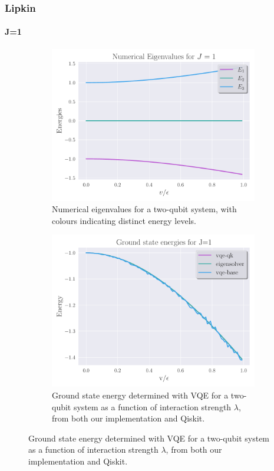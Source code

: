 \documentclass{beamer}
\begin{document}
\begin{frame}[t]
	\frametitle{Lipkin}
	\framesubtitle{J=1}
	\begin{figure}[ht]
		\centering
		\begin{subfigure}[b]{0.45\textwidth}
		\begin{center}
			\includegraphics[width=\textwidth]{../src/plots/eigs-lipkin-2.pdf}
		\end{center}
		\caption{Numerical eigenvalues for a two-qubit system, with colours indicating distinct energy levels.}
		\label{fig:eig-lipkin-2}
		\end{subfigure}
		\hfill
		\begin{subfigure}[b]{0.45\textwidth}
		\begin{center}
			\includegraphics[width=\textwidth]{../src/plots/lipkin-2.pdf}	
		\end{center}
		\caption{Ground state energy determined with VQE for a two-qubit system as a function of interaction strength $\lambda$, from both our implementation and Qiskit.}
		\label{fig:2-qb-all}
		\end{subfigure}
		\label{fig:2-qb}
	\end{figure}
\end{frame}
\end{document}
